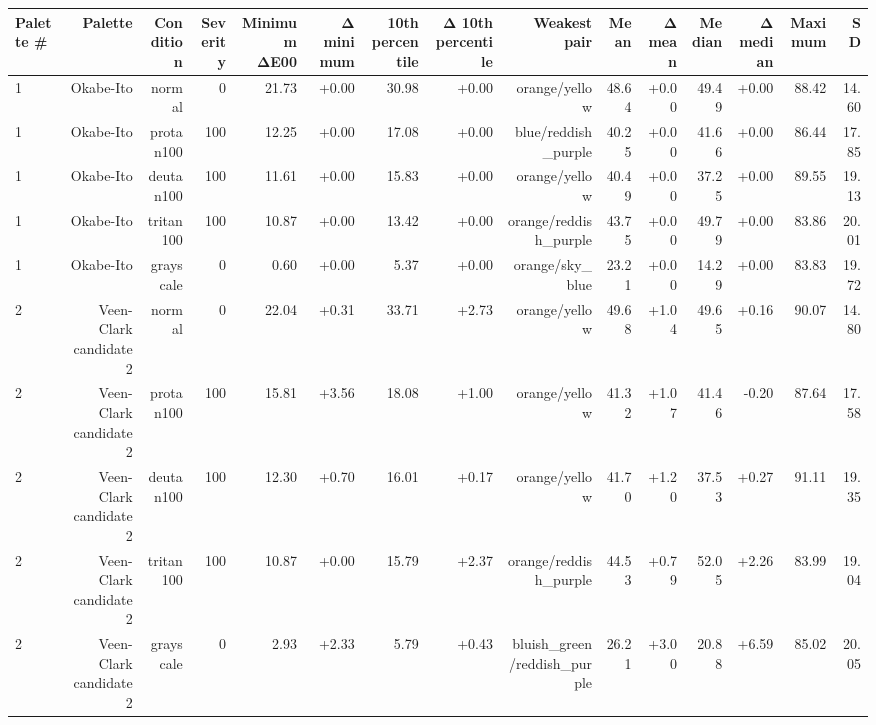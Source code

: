 \begin{tabular}{lrrrrrrrrrrrrrr}
\toprule
Palette \# & Palette & Condition & Severity & Minimum ΔE00 & Δ minimum & 10th percentile & Δ 10th percentile & Weakest pair & Mean & Δ mean & Median & Δ median & Maximum & SD \\
\midrule
1 & Okabe-Ito & normal & 0 & 21.73 & +0.00 & 30.98 & +0.00 & orange/yellow & 48.64 & +0.00 & 49.49 & +0.00 & 88.42 & 14.60 \\
1 & Okabe-Ito & protan100 & 100 & 12.25 & +0.00 & 17.08 & +0.00 & blue/reddish\_purple & 40.25 & +0.00 & 41.66 & +0.00 & 86.44 & 17.85 \\
1 & Okabe-Ito & deutan100 & 100 & 11.61 & +0.00 & 15.83 & +0.00 & orange/yellow & 40.49 & +0.00 & 37.25 & +0.00 & 89.55 & 19.13 \\
1 & Okabe-Ito & tritan100 & 100 & 10.87 & +0.00 & 13.42 & +0.00 & orange/reddish\_purple & 43.75 & +0.00 & 49.79 & +0.00 & 83.86 & 20.01 \\
1 & Okabe-Ito & grayscale & 0 & 0.60 & +0.00 & 5.37 & +0.00 & orange/sky\_blue & 23.21 & +0.00 & 14.29 & +0.00 & 83.83 & 19.72 \\
2 & Veen-Clark candidate 2 & normal & 0 & 22.04 & +0.31 & 33.71 & +2.73 & orange/yellow & 49.68 & +1.04 & 49.65 & +0.16 & 90.07 & 14.80 \\
2 & Veen-Clark candidate 2 & protan100 & 100 & 15.81 & +3.56 & 18.08 & +1.00 & orange/yellow & 41.32 & +1.07 & 41.46 & -0.20 & 87.64 & 17.58 \\
2 & Veen-Clark candidate 2 & deutan100 & 100 & 12.30 & +0.70 & 16.01 & +0.17 & orange/yellow & 41.70 & +1.20 & 37.53 & +0.27 & 91.11 & 19.35 \\
2 & Veen-Clark candidate 2 & tritan100 & 100 & 10.87 & +0.00 & 15.79 & +2.37 & orange/reddish\_purple & 44.53 & +0.79 & 52.05 & +2.26 & 83.99 & 19.04 \\
2 & Veen-Clark candidate 2 & grayscale & 0 & 2.93 & +2.33 & 5.79 & +0.43 & bluish\_green/reddish\_purple & 26.21 & +3.00 & 20.88 & +6.59 & 85.02 & 20.05 \\
\bottomrule
\end{tabular}
